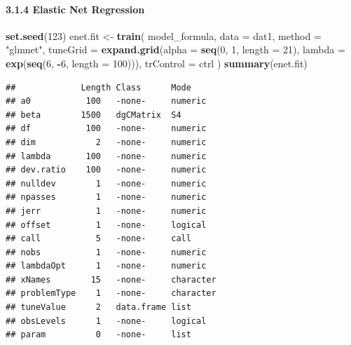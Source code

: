 \documentclass[
]{article}
\newenvironment{Shaded}{\begin{snugshade}}{\end{snugshade}}
\newcommand{\AttributeTok}[1]{\textcolor[rgb]{0.13,0.29,0.53}{#1}}
\newcommand{\DecValTok}[1]{\textcolor[rgb]{0.00,0.00,0.81}{#1}}
\newcommand{\FunctionTok}[1]{\textcolor[rgb]{0.13,0.29,0.53}{\textbf{#1}}}
\newcommand{\NormalTok}[1]{#1}
\newcommand{\OtherTok}[1]{\textcolor[rgb]{0.56,0.35,0.01}{#1}}
\newcommand{\SpecialCharTok}[1]{\textcolor[rgb]{0.81,0.36,0.00}{\textbf{#1}}}
\newcommand{\StringTok}[1]{\textcolor[rgb]{0.31,0.60,0.02}{#1}}
\begin{document}
\paragraph{3.1.4 Elastic Net Regression}\label{elastic-net-regression}

\begin{Shaded}
\begin{Highlighting}[]
\FunctionTok{set.seed}\NormalTok{(}\DecValTok{123}\NormalTok{)}
\NormalTok{enet.fit }\OtherTok{\textless{}{-}} \FunctionTok{train}\NormalTok{(}
\NormalTok{  model\_formula,}
  \AttributeTok{data =}\NormalTok{ dat1,}
  \AttributeTok{method =} \StringTok{"glmnet"}\NormalTok{,}
  \AttributeTok{tuneGrid =} \FunctionTok{expand.grid}\NormalTok{(}\AttributeTok{alpha =} \FunctionTok{seq}\NormalTok{(}\DecValTok{0}\NormalTok{, }\DecValTok{1}\NormalTok{, }\AttributeTok{length =} \DecValTok{21}\NormalTok{),}
                         \AttributeTok{lambda =} \FunctionTok{exp}\NormalTok{(}\FunctionTok{seq}\NormalTok{(}\DecValTok{6}\NormalTok{, }\SpecialCharTok{{-}}\DecValTok{6}\NormalTok{, }\AttributeTok{length =} \DecValTok{100}\NormalTok{))),}
  \AttributeTok{trControl =}\NormalTok{ ctrl}
\NormalTok{)}
\FunctionTok{summary}\NormalTok{(enet.fit)}
\end{Highlighting}
\end{Shaded}

\begin{verbatim}
##             Length Class      Mode     
## a0           100   -none-     numeric  
## beta        1500   dgCMatrix  S4       
## df           100   -none-     numeric  
## dim            2   -none-     numeric  
## lambda       100   -none-     numeric  
## dev.ratio    100   -none-     numeric  
## nulldev        1   -none-     numeric  
## npasses        1   -none-     numeric  
## jerr           1   -none-     numeric  
## offset         1   -none-     logical  
## call           5   -none-     call     
## nobs           1   -none-     numeric  
## lambdaOpt      1   -none-     numeric  
## xNames        15   -none-     character
## problemType    1   -none-     character
## tuneValue      2   data.frame list     
## obsLevels      1   -none-     logical  
## param          0   -none-     list
\end{verbatim}

\begin{Shaded}
\end{Shaded}
\end{document}
